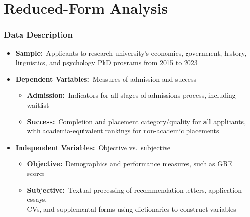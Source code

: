\documentclass[12pt, aspectratio=169]{beamer}
\begin{document}
\section{Reduced-Form Analysis}
\addtocounter{framenumber}{-1}
\begin{frame}[label=dd]
\frametitle{Data Description}
\begin{itemize}
\item \textbf{Sample:}\ Applicants to research university's economics, government, history, linguistics, and psychology PhD programs from 2015 to 2023
\vspace{10pt}
\item \textbf{Dependent Variables:}\ Measures of admission and success
\vspace{5pt}
\begin{itemize}
\item \textbf{Admission:}\ Indicators for all stages of admissions process, including waitlist
\vspace{5pt}
\item \textbf{Success:}\ Completion and placement category/quality for \textbf{all} applicants, with academia-equivalent rankings for non-academic placements \citep{krueger2000}\!\!
\vspace{10pt}
\end{itemize}
\item \textbf{Independent Variables:}\ Objective vs.\ subjective
\vspace{5pt}
\begin{itemize}
\item \textbf{Objective:}\ Demographics and performance measures, such as GRE scores
\vspace{5pt}
\item \textbf{Subjective:}\ Textual processing of recommendation letters, application essays, \\ CVs, and supplemental forms using dictionaries to construct variables 
\vspace{10pt}
\end{itemize}
\end{itemize}
\hyperlink{dv}{}
\hyperlink{ivp}{}
\hyperlink{sas}{}
\end{frame}
\end{document}

